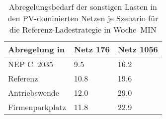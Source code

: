 {
\renewcommand{\arraystretch}{1.2}%
\begin{table}[H]
	\begin{center}
		\caption{Abregelungsbedarf der sonstigen Lasten in den PV-dominierten Netzen je Szenario für die Referenz-Ladestrategie in Woche~MIN}
		\begin{tabu} to 0.6\textwidth {X[1.5] X[1, r] X[1, r]}
			\toprule
			Abregelung in   \si{\mwh}    & Netz \num{176} & Netz \num{1056} \\ \midrule
			NEP C~\num{2035}             & \num{9.5}      & \num{16.2}      \\
			Referenz                     & \num{10.8}     & \num{19.6}      \\
			Antriebswende                & \num{12.0}     & \num{29.0}      \\
			\glqq Firmenparkplatz\grqq{} & \num{11.8}     & \num{22.9}      \\ \bottomrule
		\end{tabu}
		\label{tab:pv_dominated_week_a_load_cur}
	\end{center}
	\vspace{-3mm}%
\end{table}
}